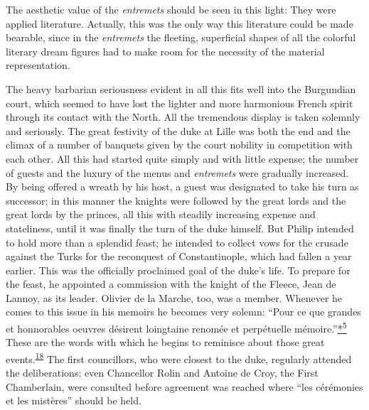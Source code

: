 \protect\hypertarget{20_ILLUSTRATIONS_FOLLOW_PAGE.xhtmlux5cux23page_305}{}{}The
aesthetic value of the \emph{entremets} should be seen in this light:
They were applied literature. Actually, this was the only way this
literature could be made bearable, since in the \emph{entremets} the
fleeting, superficial shapes of all the colorful literary dream figures
had to make room for the necessity of the material representation.

The heavy barbarian seriousness evident in all this fits well into the
Burgundian court, which seemed to have lost the lighter and more
harmonious French spirit through its contact with the North. All the
tremendous display is taken solemnly and seriously. The great festivity
of the duke at Lille was both the end and the climax of a number of
banquets given by the court nobility in competition with each other. All
this had started quite simply and with little expense; the number of
guests and the luxury of the menus and \emph{entremets} were gradually
increased. By being offered a wreath by his host, a guest was designated
to take his turn as successor; in this manner the knights were followed
by the great lords and the great lords by the princes, all this with
steadily increasing expense and stateliness, until it was finally the
turn of the duke himself. But Philip intended to hold more than a
splendid feast; he intended to collect vows for the crusade against the
Turks for the reconquest of Constantinople, which had fallen a year
earlier. This was the officially proclaimed goal of the duke's life. To
prepare for the feast, he appointed a commission with the knight of the
Fleece, Jean de Lannoy, as its leader. Olivier de la Marche, too, was a
member. Whenever he comes to this issue in his memoirs he becomes very
solemn: ``Pour ce que grandes et honnorables oeuvres désirent loingtaine
renomée et perpétuelle
mémoire.''\protect\hypertarget{20_ILLUSTRATIONS_FOLLOW_PAGE.xhtmlux5cux23id_2663}{\protect\hyperlink{23_NOTES.xhtmlux5cux23id_2664}{*\textsuperscript{5}}}
These are the words with which he begins to reminisce about those great
events.\textsuperscript{\protect\hypertarget{20_ILLUSTRATIONS_FOLLOW_PAGE.xhtmlux5cux23id_437}{\protect\hyperlink{23_NOTES.xhtmlux5cux23id_438}{18}}}
The first councillors, who were closest to the duke, regularly attended
the deliberations: even Chancellor Rolin and Antoine de Croy, the First
Chamberlain, were consulted before agreement was reached where ``les
cérémonies et les mistères'' should be held.

